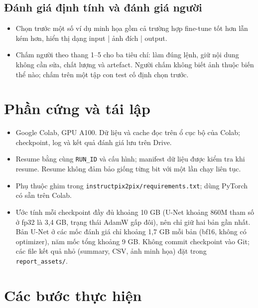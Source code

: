 \documentclass[12pt,a4paper]{article}
\begin{document}
\subsection{Đánh giá định tính và đánh giá người}

\begin{itemize}
\item Chọn trước một số ví dụ minh họa gồm cả trường hợp fine-tune tốt hơn lẫn kém
hơn, hiển thị dạng input | ảnh đích | output.
\item Chấm người theo thang 1--5 cho ba tiêu chí: làm đúng lệnh, giữ nội dung không cần
sửa, chất lượng và artefact. Người chấm không biết ảnh thuộc biến thể nào; chấm trên
một tập con test cố định chọn trước.
\end{itemize}

\section{Phần cứng và tái lập}

\begin{itemize}
\item Google Colab, GPU A100. Dữ liệu và cache đọc trên ổ cục bộ của Colab;
checkpoint, log và kết quả đánh giá lưu trên Drive.
\item Resume bằng cùng \texttt{RUN\_ID} và cấu hình; manifest dữ liệu được kiểm tra khi
resume. Resume không đảm bảo giống từng bit với một lần chạy liên tục.
\item Phụ thuộc ghim trong \texttt{instructpix2pix/requirements.txt}; dùng PyTorch có
sẵn trên Colab.
\item Ước tính mỗi checkpoint đầy đủ khoảng 10 GB (U-Net khoảng 860M tham số ở fp32
là 3,4 GB, trạng thái AdamW gấp đôi), nên chỉ giữ hai bản gần nhất. Bản U-Net ở các
mốc đánh giá chỉ khoảng 1,7 GB mỗi bản (bf16, không có optimizer), năm mốc tổng
khoảng 9 GB. Không commit checkpoint vào Git; các file kết quả nhỏ (summary, CSV,
ảnh minh họa) đặt trong \texttt{report\_assets/}.
\end{itemize}

\section{Các bước thực hiện}
\end{document}
